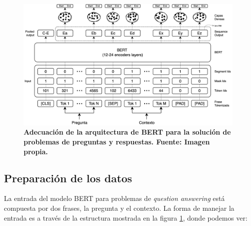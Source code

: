 \begin{figure}[ht!]
    \centering
    \includegraphics[scale=0.155]{figuras/bert-qa-architecture.png}
    \caption[Preguntas y Respuestas - Arquitectura de la solución]{\textbf{Adecuación de la arquitectura de BERT para la solución de problemas de preguntas y respuestas. Fuente: Imagen propia.}}
    \label{fig-bert-qa-architecture}
\end{figure}


\subsection{Preparación de los datos}
\label{subsection-qa-preparacion-de-los-datos}

La entrada del modelo BERT para problemas de \textit{question answering} está compuesta por dos frases, la pregunta y el contexto. La forma de manejar la entrada es a través de la estructura mostrada en la figura \ref{fig-bert-qa-architecture}, donde podemos ver:


